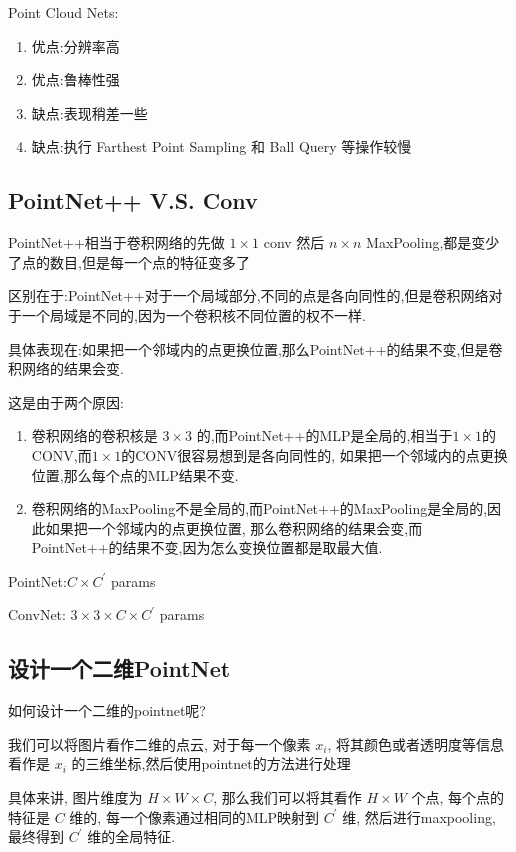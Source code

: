 Point Cloud Nets:
\begin{enumerate}
    \item 优点:分辨率高
    \item 优点:鲁棒性强
    \item 缺点:表现稍差一些
    \item 缺点:执行 Farthest Point Sampling 和 Ball Query 等操作较慢
\end{enumerate}

\subsection{PointNet++ V.S. Conv}

PointNet++相当于卷积网络的先做 $1\times 1$ conv 然后 $n\times n$ MaxPooling,都是变少了点的数目,但是每一个点的特征变多了

区别在于:PointNet++对于一个局域部分,不同的点是各向同性的,但是卷积网络对于一个局域是不同的,因为一个卷积核不同位置的权不一样.

具体表现在:如果把一个邻域内的点更换位置,那么PointNet++的结果不变,但是卷积网络的结果会变.

这是由于两个原因:
\begin{enumerate}
    \item 卷积网络的卷积核是 $3\times 3$ 的,而PointNet++的MLP是全局的,相当于$1\times 1$的CONV,而$1\times 1$的CONV很容易想到是各向同性的,
    如果把一个邻域内的点更换位置,那么每个点的MLP结果不变.
    \item 卷积网络的MaxPooling不是全局的,而PointNet++的MaxPooling是全局的,因此如果把一个邻域内的点更换位置,
    那么卷积网络的结果会变,而PointNet++的结果不变,因为怎么变换位置都是取最大值.
\end{enumerate}

PointNet:$C\times C^\prime$ params

ConvNet: $3\times 3\times C\times C^\prime$ params

\subsection{设计一个二维PointNet}

如何设计一个二维的pointnet呢?

我们可以将图片看作二维的点云, 对于每一个像素 $x_i$, 将其颜色或者透明度等信息看作是 $x_i$ 的三维坐标,然后使用pointnet的方法进行处理

具体来讲, 图片维度为 $H\times W\times C$, 那么我们可以将其看作 $H\times W$ 个点, 每个点的特征是 $C$ 维的, 
每一个像素通过相同的MLP映射到 $C^\prime$ 维, 然后进行maxpooling, 最终得到 $C^\prime$ 维的全局特征.